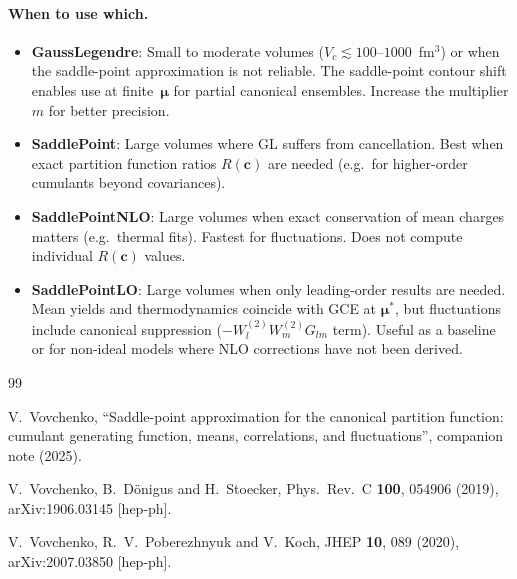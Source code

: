 \documentclass[11pt]{article}
\newcommand{\bmu}{\bm{\mu}}
\newcommand{\bc}{\mathbf{c}}
\begin{document}
\paragraph{When to use which.}
\begin{itemize}
  \item \textbf{GaussLegendre}: Small to moderate volumes ($V_c \lesssim 100$--$1000$~fm$^3$) or when the saddle-point approximation is not reliable.
    The saddle-point contour shift enables use at finite~$\bmu$ for partial canonical ensembles.
    Increase the multiplier $m$ for better precision.
  \item \textbf{SaddlePoint}: Large volumes where GL suffers from cancellation.
    Best when exact partition function ratios $R(\bc)$ are needed (e.g.\ for higher-order cumulants beyond covariances).
  \item \textbf{SaddlePointNLO}: Large volumes when exact conservation of mean charges matters (e.g.\ thermal fits).
    Fastest for fluctuations. Does not compute individual $R(\bc)$ values.
  \item \textbf{SaddlePointLO}: Large volumes when only leading-order results are needed.
    Mean yields and thermodynamics coincide with GCE at $\bmu^*$, but fluctuations include canonical suppression ($-W_l^{(2)} W_m^{(2)} G_{lm}$ term).
    Useful as a baseline or for non-ideal models where NLO corrections have not been derived.
\end{itemize}


\begin{thebibliography}{99}

  V.~Vovchenko,
  ``Saddle-point approximation for the canonical partition function:
  cumulant generating function, means, correlations, and fluctuations'',
  companion note (2025).

  V.~Vovchenko, B.~D\"onigus and H.~Stoecker,
  Phys.\ Rev.\ C \textbf{100}, 054906 (2019),
  arXiv:1906.03145 [hep-ph].

  V.~Vovchenko, R.~V.~Poberezhnyuk and V.~Koch,
  JHEP \textbf{10}, 089 (2020),
  arXiv:2007.03850 [hep-ph].

\end{thebibliography}
\end{document}
